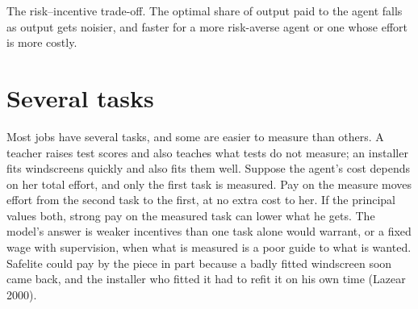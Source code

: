 \label{lst:b2:moral-hazard:linear}

\label{out:b2:moral-hazard:linear}

\begin{omfigure}

{\small The risk--incentive trade-off. The optimal share of output paid to the agent falls as output gets noisier, and
faster for a more risk-averse agent or one whose effort is more costly.}
\end{omfigure}

\section{Several tasks}\label{sec:b2:moral-hazard:multitask}

Most jobs have several tasks, and some are easier to measure than others. A teacher raises test scores and also teaches
what tests do not measure; an installer fits windscreens quickly and also fits them well. Suppose the agent's cost
depends on her total effort, and only the first task is measured. Pay on the measure moves effort from the second task to
the first, at no extra cost to her. If the principal values both, strong pay on the measured task can lower what he gets.
The model's answer is weaker incentives than one task alone would warrant, or a fixed wage with supervision, when what is
measured is a poor guide to what is wanted. Safelite could pay by the piece in part because a badly fitted windscreen soon came
back, and the installer who fitted it had to refit it on his own time (Lazear 2000).

